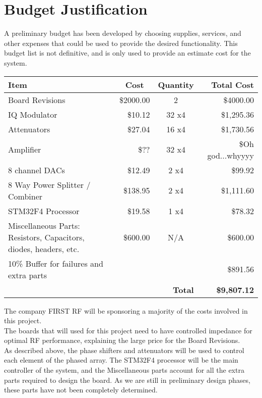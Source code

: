 \documentclass[UROP.tex]{subfiles}
\begin{document}
\bigskip
\section{\Large Budget Justification}
	A preliminary budget has been developed by choosing supplies, services, and other expenses that could be used to provide the desired functionality.  This budget list is not definitive, and is only used to provide an estimate cost for the system.\\
\begin{table}[H]
\doublespacing
\centering
\begin{tabular}{| p{7cm} | r | c | r |}
\hline

  Item & \multicolumn{1}{|c|}{Cost} & Quantity & Total Cost \\\hline\hline
  Board Revisions & \$2000.00 & 2 & \$4000.00  \\
  IQ Modulator & \$10.12 & 32 x4 & \$1,295.36 \\ 
  Attenuators & \$27.04 & 16 x4 & \$1,730.56 \\
  Amplifier & \$?? & 32 x4 & \$Oh god...whyyyy \\
  8 channel DACs & \$12.49 & 2 x4 & \$99.92 \\
  8 Way Power Splitter / Combiner & \$138.95 & 2 x4 & \$1,111.60 \\
  STM32F4 Processor & \$19.58 & 1 x4 & \$78.32\\
  Miscellaneous Parts: Resistors, Capacitors, diodes, headers, etc. & \$600.00 & N/A & \$600.00\\
  10\% Buffer for failures and extra parts & & &\$891.56\\\hline
  \multicolumn{3}{r}{\textbf{Total}} & \multicolumn{1}{r}{\textbf{\$9,807.12}}

 \end{tabular}
\end{table}

The company FIRST RF will be sponsoring a majority of the costs involved in this project.\\

The boards that will used for this project need to have controlled impedance for optimal RF performance, explaining the large price for the Board Revisions.\\

As described above, the phase shifters and attenuators will be used to control each element of the phased array.  The STM32F4 processor will be the main controller of the system, and the Miscellaneous parts account for all the extra parts required to design the board.  As we are still in preliminary design phases, these parts have not been completely determined.
\end{document}
